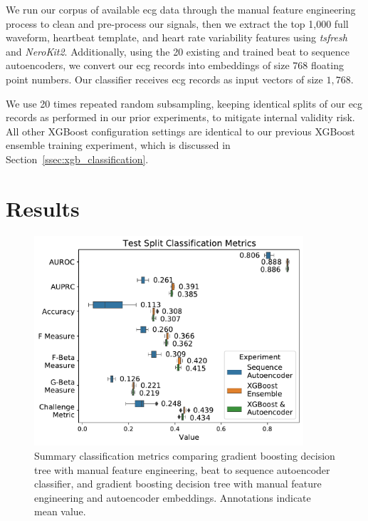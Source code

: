 \documentclass[\main/thesis.tex]{subfiles}
\begin{document}
We run our corpus of available \gls{ecg} data through the manual feature engineering process to clean and pre-process our signals, then we extract the top 1,000 full waveform, heartbeat template, and heart rate variability features using \emph{tsfresh} and \emph{NeroKit2}.
Additionally, using the 20 existing and trained beat to sequence autoencoders, we convert our \gls{ecg} records into embeddings of size 768 floating point numbers.
Our classifier receives \gls{ecg} records as input vectors of size $1,768$.

We use 20 times repeated random subsampling, keeping identical splits of our \gls{ecg} records as performed in our prior experiments, to mitigate internal validity risk.
All other XGBoost configuration settings are identical to our previous XGBoost ensemble training experiment, which is discussed in Section~\ref{ssec:xgb_classification}.

\section{Results}

\begin{figure}[ht]
    \centering
    \includegraphics[width=10cm]{figure/classification_metrics_3_way.pdf}
    \caption[Summary classification metrics comparing gradient boosting decision tree with manual feature engineering, beat to sequence autoencoder classifier, and gradient boosting decision tree with manual feature engineering and autoencoder embeddings.]{Summary classification metrics comparing gradient boosting decision tree with manual feature engineering, beat to sequence autoencoder classifier, and gradient boosting decision tree with manual feature engineering and autoencoder embeddings. Annotations indicate mean value.}
    \label{fig:joint_xgb_aenc_classification_metrics_summary}
\end{figure}
\end{document}
